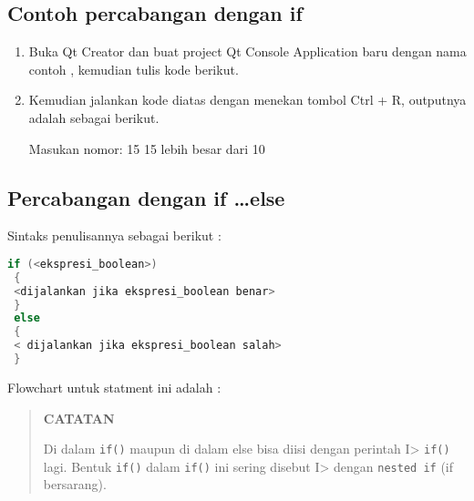 \subsection*{Contoh percabangan dengan if}

\begin{enumerate}
	\item  Buka Qt Creator dan buat project Qt Console Application baru dengan
	nama contoh , kemudian tulis kode berikut.
	
	
	
	\item  Kemudian jalankan kode diatas dengan menekan tombol Ctrl + R, outputnya adalah sebagai berikut.
	
\begin{lcverbatim}
Masukan nomor: 15
15 lebih besar dari 10
\end{lcverbatim}
\end{enumerate}
\subsection{Percabangan dengan if \dots else}\label{percabangan-dengan-if-..-else}

Sintaks penulisannya sebagai berikut :

\begin{lstlisting}[language=c++]
 if (<ekspresi_boolean>)
 {
 <dijalankan jika ekspresi_boolean benar>
 }
 else
 {
 < dijalankan jika ekspresi_boolean salah>
 }
\end{lstlisting}

Flowchart untuk statment ini adalah :

\begin{quotation}
 {\LARGE {}} \textbf{CATATAN} 

Di
dalam \texttt{if()} maupun di dalam else bisa diisi dengan perintah
I\textgreater{} \texttt{if()} lagi. Bentuk \texttt{if()} dalam
\texttt{if()} ini sering disebut I\textgreater{} dengan
\texttt{nested\ if} (if bersarang).
\end{quotation}


